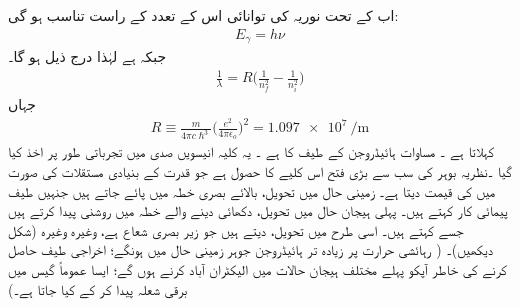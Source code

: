 اب   کے تحت  نوریہ  کی توانائی اس کے تعدد کے راست تناسب ہو گی:
\begin{align}
E_{\gamma}=h\nu
\end{align}
جبکہ        ہے لہٰذا درج ذیل ہو گا۔
\begin{align}\label{مساوات_تین_ابعادی_رڈبرگ_کلیہ}
\frac{1}{\lambda}=R\big(\frac{1}{n^{2}_{f}}-\frac{1}{n^{2}_{i}}\big)
\end{align}
جہاں 
\begin{align}
R\equiv \frac{m}{4\pi{c}\hslash^{3}}\big(\frac{e^{2}}{4\pi\epsilon_{o}}\big)^{2}=\SI{1.097e7}{\per\meter}
\end{align}
 کہلاتا ہے ۔ مساوات  ہائیڈروجن کے طیف کا    ہے ۔ یہ کلیہ انیسویں  صدی میں تجرباتی طور پر اخذ کیا گیا ۔نظریہ بوہر  کی سب سے بڑی فتح  اس کلیے کا حصول ہے جو قدرت کے بنیادی مستقلات  کی صورت میں   کی قیمت دیتا ہے۔ زمینی حال    میں تحویل،   بالائے بصری خطہ میں پائے  جاتے  ہیں  جنہیں    طیف پیمائی کار   کہتے ہیں۔ پہلی  ہیجان  حال  
میں تحویل،     دکھائی دینے والے خطہ میں  روشنی پیدا  کرتے  ہیں  جسے   کہتے ہیں۔  اسی طرح     میں  تحویل،   دیتے ہیں  جو  زیر  بصری شعاع ہے، وغیرہ وغیرہ  (شکل        دیکھیں)۔  (  رہائشی حرارت پر زیادہ تر  ہائیڈروجن  جوہر زمینی حال میں ہونگے؛ اخراجی طیف حاصل کرنے کی خاطر آپکو پہلے مختلف  ہیجان  حالات میں الیکٹران  آباد کرنے ہوں گے؛  ایسا عموماً گیس میں برقی شعلہ   پیدا کر کے کیا جاتا ہے۔)



